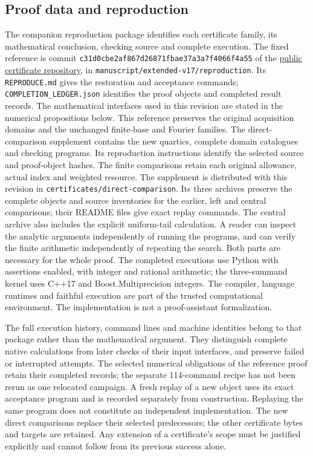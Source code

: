 \subsection{Proof data and reproduction}
\label{j:cert:reproduction}
The companion reproduction package identifies each certificate family,
its mathematical conclusion, checking source and complete execution.
The fixed reference is commit
\texttt{c31d0cbe2af867d26871fbae37a3a7f4066f4a55} of the
\href{https://github.com/kolodziejek/berry-esseen-certificates/tree/c31d0cbe2af867d26871fbae37a3a7f4066f4a55/manuscript/extended-v17/reproduction}
{public certificate repository}, in
\texttt{manuscript/extended-v17/reproduction}.
Its \texttt{REPRODUCE.md} gives the restoration and acceptance commands;
\texttt{COMPLETION\_LEDGER.json} identifies the proof objects and
completed result records. The mathematical interfaces used in this
revision are stated in the numerical propositions below.
This reference preserves the original acquisition domains and the
unchanged finite-base and Fourier families. The direct-comparison
supplement contains the new quartics, complete domain catalogues and
checking programs. Its reproduction instructions identify the selected
source and proof-object hashes. The finite comparisons retain each
original allowance, actual index and weighted resource.
The supplement is distributed with this revision in
\texttt{certificates/direct-comparison}. Its three archives preserve the
complete objects and source inventories for the earlier, left and central
comparisons; their README files give exact replay commands. The central
archive also includes the explicit uniform-tail calculation.
A reader can inspect the analytic arguments independently of running
the programs, and can verify the finite arithmetic independently of
repeating the search. Both parts are necessary for the whole proof.
The completed executions use Python with assertions enabled, with integer and rational
arithmetic; the three-summand kernel uses C++17 and
Boost.Multiprecision integers. The compiler, language runtimes and
faithful execution are part of the trusted computational environment.
The implementation is not a proof-assistant formalization.

The full execution history, command lines and machine identities belong
to that package rather than the mathematical argument. They distinguish
complete native calculations from later checks of their input
interfaces, and preserve failed or interrupted attempts. The selected numerical obligations of the reference proof retain their
completed records; the separate 114-command recipe has not been rerun as
one relocated campaign. A fresh replay of a new object uses its exact
acceptance program and is recorded separately from construction. Replaying
the same program does not constitute an independent implementation.
The new direct comparisons replace their selected predecessors; the
other certificate bytes and targets are retained. Any extension of a
certificate's scope must be justified explicitly and cannot follow from
its previous success alone.
